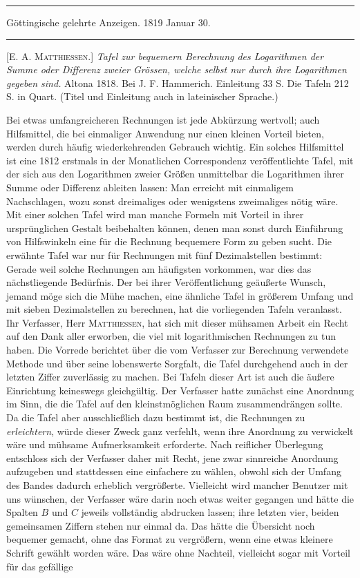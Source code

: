 \par{}\medskip\hrule\smallskip
\begin{center}
Göttingische gelehrte Anzeigen. 1819 Januar 30.
\end{center}
\smallskip\hrule\medskip

[E. A. \textsc{Matthiessen}.] \textit{Tafel zur bequemern Berechnung des Logarithmen der
Summe oder Differenz zweier Grössen, welche selbst nur durch ihre Logarithmen gegeben sind.} Altona 1818. Bei J. F. Hammerich. Einleitung 33 S. Die Tafeln
212 S. in Quart. (Titel und Einleitung auch in lateinischer Sprache.)

Bei etwas umfangreicheren Rechnungen ist jede Abkürzung wertvoll; auch Hilfsmittel, die bei einmaliger Anwendung nur einen kleinen Vorteil bieten, werden durch häufig wiederkehrenden Gebrauch wichtig. Ein solches Hilfsmittel ist eine 1812 erstmals in der Monatlichen Correspondenz veröffentlichte Tafel, mit der sich aus den Logarithmen zweier Größen unmittelbar die Logarithmen ihrer Summe oder Differenz ableiten lassen: Man erreicht mit einmaligem Nachschlagen, wozu sonst dreimaliges oder wenigstens zweimaliges nötig wäre. Mit einer solchen Tafel wird man manche  Formeln mit Vorteil in ihrer ursprünglichen Gestalt beibehalten können, denen man sonst durch Einführung von Hilfswinkeln eine für die Rechnung bequemere Form zu geben sucht. Die erwähnte Tafel war nur für Rechnungen mit fünf Dezimalstellen bestimmt: Gerade weil solche Rechnungen am häufigsten vorkommen, war dies das nächstliegende Bedürfnis. Der bei ihrer Veröffentlichung geäußerte Wunsch, jemand möge sich die Mühe machen, eine ähnliche Tafel in größerem Umfang und mit sieben Dezimalstellen zu berechnen, hat die vorliegenden Tafeln veranlasst. Ihr Verfasser, Herr \textsc{Matthiessen}, hat sich mit dieser mühsamen Arbeit ein Recht auf den Dank aller erworben, die viel mit logarithmischen Rechnungen zu tun haben. Die Vorrede berichtet über die vom Verfasser zur Berechnung verwendete Methode und über seine lobenswerte Sorgfalt, die Tafel durchgehend auch in der letzten Ziffer zuverlässig zu machen. Bei Tafeln dieser Art ist auch die äußere Einrichtung keineswegs gleichgültig. Der Verfasser hatte zunächst eine Anordnung im Sinn, die die Tafel auf den kleinstmöglichen Raum zusammendrängen sollte. Da die Tafel aber ausschließlich dazu bestimmt ist, die Rechnungen zu \textit{erleichtern}, würde dieser Zweck ganz verfehlt, wenn ihre Anordnung zu verwickelt wäre und mühsame Aufmerksamkeit erforderte. Nach reiflicher Überlegung entschloss sich der Verfasser daher mit Recht, jene zwar sinnreiche Anordnung aufzugeben und stattdessen eine einfachere zu wählen, obwohl sich der Umfang des Bandes dadurch erheblich vergrößerte. Vielleicht wird mancher Benutzer mit uns wünschen, der Verfasser wäre darin noch etwas weiter gegangen und hätte die Spalten \(B\) und \(C\) jeweils vollständig abdrucken lassen; ihre letzten vier, beiden gemeinsamen Ziffern stehen nur einmal da. Das hätte die Übersicht noch bequemer gemacht, ohne das Format zu vergrößern, wenn eine etwas kleinere Schrift gewählt worden wäre. Das wäre ohne Nachteil, vielleicht sogar mit Vorteil für das gefällige 